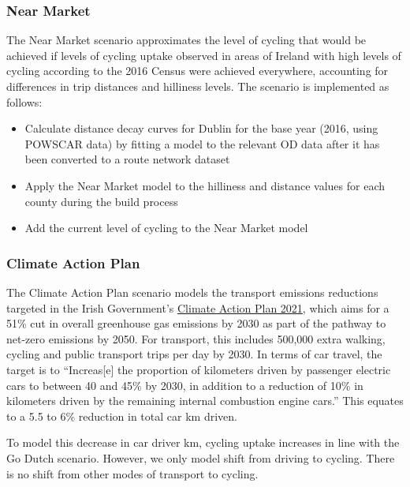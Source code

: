 \documentclass[
  super,
  preprint,
  3p]{elsarticle}
\providecommand{\tightlist}{%
  \setlength{\itemsep}{0pt}\setlength{\parskip}{0pt}}\usepackage{longtable,booktabs,array}
\begin{document}
\subsubsection{Near Market}\label{near-market}

The Near Market scenario approximates the level of cycling that would be
achieved if levels of cycling uptake observed in areas of Ireland with
high levels of cycling according to the 2016 Census were achieved
everywhere, accounting for differences in trip distances and hilliness
levels. The scenario is implemented as follows:

\begin{itemize}
\tightlist
\item
  Calculate distance decay curves for Dublin for the base year (2016,
  using POWSCAR data) by fitting a model to the relevant OD data after
  it has been converted to a route network dataset
\item
  Apply the Near Market model to the hilliness and distance values for
  each county during the build process
\item
  Add the current level of cycling to the Near Market model
\end{itemize}

\subsubsection{Climate Action Plan}\label{climate-action-plan}

The Climate Action Plan scenario models the transport emissions
reductions targeted in the Irish Government's
\href{https://www.gov.ie/en/publication/6223e-climate-action-plan-2021/}{Climate
Action Plan 2021}, which aims for a 51\% cut in overall greenhouse gas
emissions by 2030 as part of the pathway to net-zero emissions by 2050.
For transport, this includes 500,000 extra walking, cycling and public
transport trips per day by 2030. In terms of car travel, the target is
to ``Increas{[}e{]} the proportion of kilometers driven by passenger
electric cars to between 40 and 45\% by 2030, in addition to a reduction
of 10\% in kilometers driven by the remaining internal combustion engine
cars.'' This equates to a 5.5 to 6\% reduction in total car km driven.

To model this decrease in car driver km, cycling uptake increases in
line with the Go Dutch scenario. However, we only model shift from
driving to cycling. There is no shift from other modes of transport to
cycling.
\end{document}
